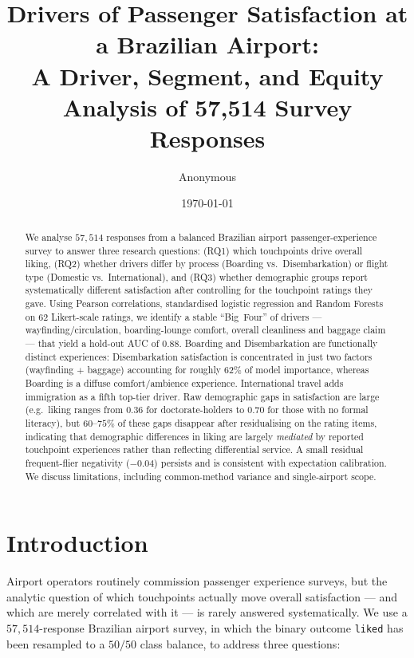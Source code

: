 \documentclass[11pt]{article}
\title{Drivers of Passenger Satisfaction at a Brazilian Airport: \\
       A Driver, Segment, and Equity Analysis of 57{,}514 Survey Responses}
\author{Anonymous}
\date{\today}
\begin{document}
\maketitle

\begin{abstract}
We analyse $57{,}514$ responses from a balanced Brazilian airport passenger-experience survey to answer three research questions: (RQ1) which touchpoints drive overall liking, (RQ2) whether drivers differ by process (Boarding vs.\ Disembarkation) or flight type (Domestic vs.\ International), and (RQ3) whether demographic groups report systematically different satisfaction after controlling for the touchpoint ratings they gave. Using Pearson correlations, standardised logistic regression and Random Forests on $62$ Likert-scale ratings, we identify a stable ``Big~Four'' of drivers --- wayfinding/circulation, boarding-lounge comfort, overall cleanliness and baggage claim --- that yield a hold-out AUC of $0.88$. Boarding and Disembarkation are functionally distinct experiences: Disembarkation satisfaction is concentrated in just two factors (wayfinding $+$ baggage) accounting for roughly $62\%$ of model importance, whereas Boarding is a diffuse comfort/ambience experience. International travel adds immigration as a fifth top-tier driver. Raw demographic gaps in satisfaction are large (e.g.\ liking ranges from $0.36$ for doctorate-holders to $0.70$ for those with no formal literacy), but $60$--$75\%$ of these gaps disappear after residualising on the rating items, indicating that demographic differences in liking are largely \emph{mediated} by reported touchpoint experiences rather than reflecting differential service. A small residual frequent-flier negativity ($-0.04$) persists and is consistent with expectation calibration. We discuss limitations, including common-method variance and single-airport scope.
\end{abstract}

\section{Introduction}
\label{sec:intro}

Airport operators routinely commission passenger experience surveys, but the analytic question of which touchpoints actually move overall satisfaction --- and which are merely correlated with it --- is rarely answered systematically. We use a $57{,}514$-response Brazilian airport survey, in which the binary outcome \texttt{liked} has been resampled to a $50/50$ class balance, to address three questions:
\end{document}
